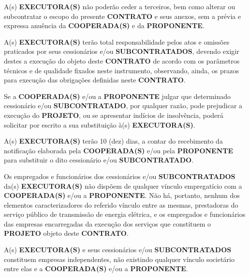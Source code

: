 

\xx A(s) \textbf{EXECUTORA(S)} não poderão ceder a terceiros, bem como alterar ou subcontratar o escopo do presente \textbf{CONTRATO} e seus anexos, sem a prévia e expressa anuência da \textbf{COOPERADA(S)} e da \textbf{PROPONENTE}.

\xx A(s) \textbf{EXECUTORA(S)} terão total responsabilidade pelos atos e omissões praticados por seus cessionários e/ou \textbf{SUBCONTRATADOS}, devendo exigir destes a execução do objeto deste \textbf{CONTRATO} de acordo com os parâmetros técnicos e de qualidade fixados neste instrumento, observando, ainda, os prazos para execução das obrigações definidas neste \textbf{CONTRATO}.

\xx Se a \textbf{COOPERADA(S)} e/ou a \textbf{PROPONENTE} julgar que determinado cessionário e/ou \textbf{SUBCONTRATADO}, por qualquer razão, pode prejudicar a execução do \textbf{PROJETO}, ou se apresentar indícios de insolvência, poderá solicitar por escrito a sua substituição à(s) \textbf{EXECUTORA(S)}.

\xx A(s) \textbf{EXECUTORA(S)} terão 10 (dez) dias, a contar do recebimento da notificação elaborada pela \textbf{COOPERADA(S)} e/ou pela \textbf{PROPONENTE} para substituir o dito cessionário e/ou \textbf{SUBCONTRATADO}.

\xx Os empregados e funcionários dos cessionários e/ou \textbf{SUBCONTRATADOS} da(s) \textbf{EXECUTORA(S)} não dispõem de qualquer vínculo empregatício com a \textbf{COOPERADA(S)} e/ou a \textbf{PROPONENTE}. Não há, portanto, nenhum dos elementos caracterizadores do referido vínculo entre as mesmas, prestadoras do serviço público de transmissão de energia elétrica, e os empregados e funcionários das empresas encarregadas da execução dos serviços que constituem o \textbf{PROJETO} objeto deste \textbf{CONTRATO}.

\xx A(s) \textbf{EXECUTORA(S)} e seus cessionários e/ou \textbf{SUBCONTRATADOS} constituem empresas independentes, não existindo qualquer vínculo societário entre elas e a \textbf{COOPERADA(S)} e/ou a \textbf{PROPONENTE}.
